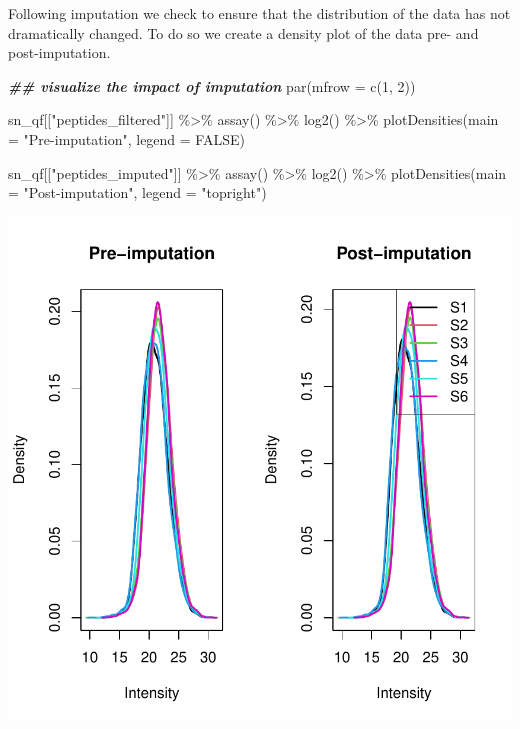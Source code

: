 \documentclass[9pt,a4paper,]{extarticle}
\newenvironment{Shaded}{\begin{snugshade}}{\end{snugshade}}
\newcommand{\AttributeTok}[1]{\textcolor[rgb]{0.77,0.63,0.00}{#1}}
\newcommand{\ConstantTok}[1]{\textcolor[rgb]{0.00,0.00,0.00}{#1}}
\newcommand{\DecValTok}[1]{\textcolor[rgb]{0.00,0.00,0.81}{#1}}
\newcommand{\DocumentationTok}[1]{\textcolor[rgb]{0.56,0.35,0.01}{\textbf{\textit{#1}}}}
\newcommand{\FunctionTok}[1]{\textcolor[rgb]{0.00,0.00,0.00}{#1}}
\newcommand{\NormalTok}[1]{#1}
\newcommand{\SpecialCharTok}[1]{\textcolor[rgb]{0.00,0.00,0.00}{#1}}
\newcommand{\StringTok}[1]{\textcolor[rgb]{0.31,0.60,0.02}{#1}}
\begin{document}
Following imputation we check to ensure that the distribution of the data has
not dramatically changed. To do so we create a density plot of the data pre- and
post-imputation.

\begin{Shaded}
\begin{Highlighting}[]
\DocumentationTok{\#\# visualize the impact of imputation}
\FunctionTok{par}\NormalTok{(}\AttributeTok{mfrow =} \FunctionTok{c}\NormalTok{(}\DecValTok{1}\NormalTok{, }\DecValTok{2}\NormalTok{))}

\NormalTok{sn\_qf[[}\StringTok{"peptides\_filtered"}\NormalTok{]] }\SpecialCharTok{\%\textgreater{}\%}
  \FunctionTok{assay}\NormalTok{() }\SpecialCharTok{\%\textgreater{}\%}
  \FunctionTok{log2}\NormalTok{() }\SpecialCharTok{\%\textgreater{}\%}
  \FunctionTok{plotDensities}\NormalTok{(}\AttributeTok{main =} \StringTok{"Pre{-}imputation"}\NormalTok{,}
                \AttributeTok{legend =} \ConstantTok{FALSE}\NormalTok{)}

\NormalTok{sn\_qf[[}\StringTok{"peptides\_imputed"}\NormalTok{]] }\SpecialCharTok{\%\textgreater{}\%}
  \FunctionTok{assay}\NormalTok{() }\SpecialCharTok{\%\textgreater{}\%}
  \FunctionTok{log2}\NormalTok{() }\SpecialCharTok{\%\textgreater{}\%}
  \FunctionTok{plotDensities}\NormalTok{(}\AttributeTok{main =} \StringTok{"Post{-}imputation"}\NormalTok{,}
                \AttributeTok{legend =} \StringTok{"topright"}\NormalTok{)}
\end{Highlighting}
\end{Shaded}

\begin{center}\includegraphics[width=0.8\linewidth]{workflow_expressions_files/figure-latex/lfq_imputation_4-1} \end{center}
\end{document}
